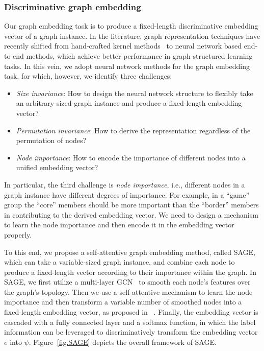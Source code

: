 \documentclass[sigconf]{acmart}
\begin{document}
\subsubsection{Discriminative graph embedding}\label{dem}

Our graph embedding task is to produce a fixed-length discriminative embedding vector of a graph instance.  In the literature, graph representation techniques have recently shifted from hand-crafted kernel methods~\cite{Yanardag:2015:DGK:2783258.2783417} to neural network based end-to-end methods, which achieve better performance in graph-structured learning tasks.  In this vein, we adopt neural network methods for the graph embedding task, for which, however, we identify three challenges:

\begin{itemize}
\item  \emph{Size invariance}: How to design the neural network structure to flexibly take an arbitrary-sized graph instance and produce a fixed-length embedding vector?
\item  \emph{Permutation invariance}: How to derive the representation regardless of the permutation of nodes?
\item  \emph{Node importance}: How to encode the importance of different nodes into a unified embedding vector?
\end{itemize}

In particular, the third challenge is \emph{node importance}, i.e., different nodes in a graph instance have different degrees of importance.  For example, in a ``game'' group the ``core'' members should be more important than the ``border'' members in contributing to the derived embedding vector.  We need to design a mechanism to learn the node importance and then encode it in the embedding vector properly.

To this end, we propose a self-attentive graph embedding method, called SAGE, which can take a variable-sized graph instance, and combine each node to produce a fixed-length vector according to their importance within the graph.  In SAGE, we first utilize a multi-layer GCN~\cite{kipf2017semi} to smooth each node's features over the graph's topology.  Then we use a self-attentive mechanism to learn the node importance and then transform a variable number of smoothed nodes into a fixed-length embedding vector, as proposed in ~\cite{DBLP:journals/corr/LinFSYXZB17}.  Finally, the embedding vector is cascaded with a fully connected layer and a softmax function, in which the label information can be leveraged to discriminatively transform the embedding vector $e$ into $\psi$.  Figure~\ref{fig.SAGE} depicts the overall framework of SAGE.
\end{document}
